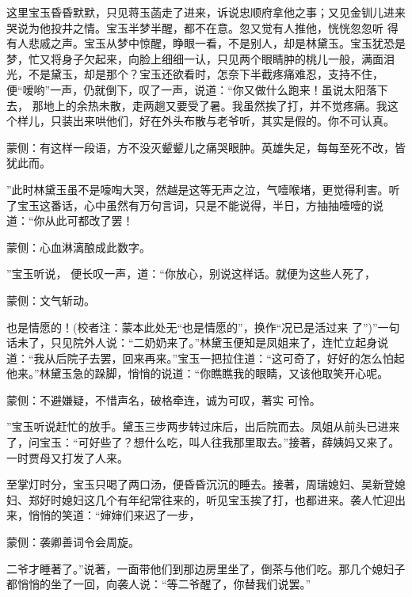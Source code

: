 \begin{parag}
    这里宝玉昏昏默默，只见蒋玉菡走了进来，诉说忠顺府拿他之事；又见金钏儿进来哭说为他投井之情。宝玉半梦半醒，都不在意。忽又觉有人推他，恍恍忽忽听 得有人悲戚之声。宝玉从梦中惊醒，睁眼一看，不是别人，却是林黛玉。宝玉犹恐是梦，忙又将身子欠起来，向脸上细细一认，只见两个眼睛肿的桃儿一般，满面泪光，不是黛玉，却是那个？宝玉还欲看时，怎奈下半截疼痛难忍，支持不住，便“嗳哟”一声，仍就倒下，叹了一声，说道：“你又做什么跑来！虽说太阳落下去， 那地上的余热未散，走两趟又要受了暑。我虽然挨了打，并不觉疼痛。我这个样儿，只装出来哄他们，好在外头布散与老爷听，其实是假的。你不可认真。\begin{note}蒙侧：有这样一段语，方不没灭颦颦儿之痛哭眼肿。英雄失足，每每至死不改，皆犹此而。\end{note}”此时林黛玉虽不是嚎啕大哭，然越是这等无声之泣，气噎喉堵，更觉得利害。听了宝玉这番话，心中虽然有万句言词，只是不能说得，半日，方抽抽噎噎的说道：“你从此可都改了罢！\begin{note}蒙侧：心血淋漓酿成此数字。\end{note}”宝玉听说， 便长叹一声，道：“你放心，别说这样话。就便为这些人死了，\begin{note}蒙侧：文气斩动。\end{note}也是情愿的！(校者注：蒙本此处无“也是情愿的”，换作“况已是活过来 了”)”一句话未了，只见院外人说：“二奶奶来了。”林黛玉便知是凤姐来了，连忙立起身说道：“我从后院子去罢，回来再来。”宝玉一把拉住道：“这可奇了，好好的怎么怕起他来。”林黛玉急的跺脚，悄悄的说道：“你瞧瞧我的眼睛，又该他取笑开心呢。\begin{note}蒙侧：不避嫌疑，不惜声名，破格牵连，诚为可叹，著实 可怜。\end{note}”宝玉听说赶忙的放手。黛玉三步两步转过床后，出后院而去。凤姐从前头已进来了，问宝玉：“可好些了？想什么吃，叫人往我那里取去。”接著，薛姨妈又来了。一时贾母又打发了人来。
\end{parag}


\begin{parag}
    至掌灯时分，宝玉只喝了两口汤，便昏昏沉沉的睡去。接著，周瑞媳妇、吴新登媳妇、郑好时媳妇这几个有年纪常往来的，听见宝玉挨了打，也都进来。袭人忙迎出来，悄悄的笑道：“婶婶们来迟了一步，\begin{note}蒙侧：袭卿善词令会周旋。\end{note}二爷才睡著了。”说著，一面带他们到那边房里坐了，倒茶与他们吃。那几个媳妇子都悄悄的坐了一回，向袭人说：“等二爷醒了，你替我们说罢。”
\end{parag}


